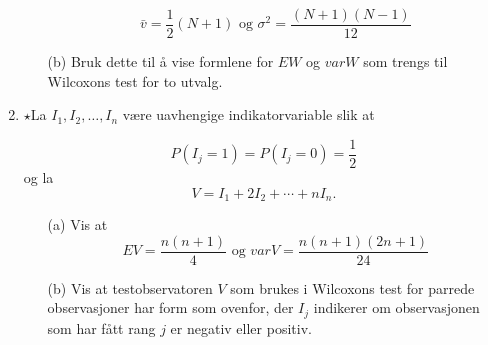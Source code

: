 \begin{enumerate}
\begin{itemize}
\[  \bar{v}=\frac{1}{2}(N+1) \mbox{\ \ og \ \ } 
                               {\sigma}^2=\frac{(N+1)(N-1)}{12} \]
\item[(b)] Bruk dette til å vise formlene for $EW$ og $varW$ som
trengs til Wil\-coxons test for to utvalg.
\end{itemize}

\item
 $\star$La $I_1, I_2, \ldots, I_n$ være uavhengige indikatorvariable
slik at

\[  P(I_j=1)=P(I_j=0)=\frac{1}{2}    \]
og la
\[ V=I_1+2I_2+\cdots +nI_n. \]
\begin{itemize}
\item[(a)] Vis at 
\[   EV=\frac{n(n+1)}{4} \mbox{\ \ og \ \ }
                     varV=\frac{n(n+1)(2n+1)}{24} \]
\item[(b)] Vis at testobservatoren $V$ som brukes i Wilcoxons test 
for parrede observasjoner har form som ovenfor, der $I_j$ indikerer
om observasjonen som har fått rang $j$ er negativ eller positiv.
\end{itemize}
\end{enumerate}
\normalsize



